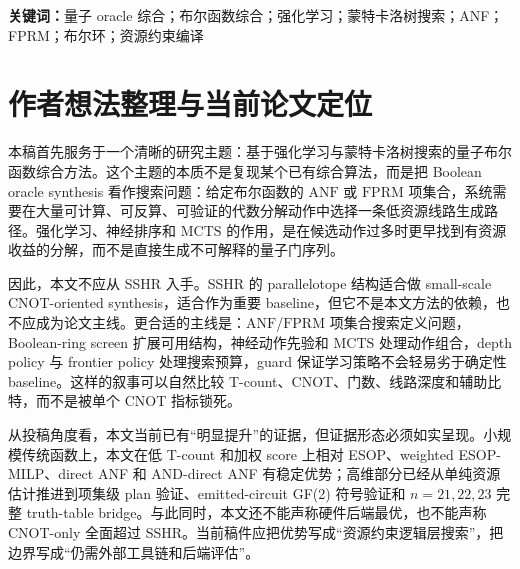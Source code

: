 \documentclass[UTF8,fontset=macnew,11pt]{ctexart}
\newcommand{\method}{Resource-NMCTS}
\newcommand{\anf}{\ensuremath{\mathrm{ANF}}}
\newcommand{\fprm}{\ensuremath{\mathrm{FPRM}}}
\newcommand{\mcts}{\ensuremath{\mathrm{MCTS}}}
\newcommand{\ttable}{truth-table}
\newcommand{\mct}{\ensuremath{\mathrm{MCT}}}
\begin{document}
\begin{abstract}
所有 6600 个项集级方法行均通过 factor-plan \anf{} 展开验证和 emitted X/CNOT/\mct{} circuit 的 GF(2) 多项式符号模拟验证；进一步的 $n=21,22,23$ bridge、large-policy $n=23$ rerun 和 cost-aware $n=23$ rerun 中，300/300 个方法行同时通过完整 \ttable{} oracle 验证、plan 验证和 emitted-circuit 符号验证。新增 emitted-circuit schedule proxy 显示，large frontier policy 在 $n=23$ 完整 bridge 上相对旧 policy 为 1/0/5，平均 score 再降 0.48\%，T-depth proxy 再降 0.45\%；cost-aware policy 则相对 large policy 以 +0.92\% score 代价换取 56.29\% plan time 下降和 12.62\% lifetime area 下降。本文的阶段性结论是：\method{} 已形成一条独立于 SSHR、以低 T-count 和低加权逻辑资源为目标的 Boolean oracle synthesis 主线；当前最需要补强的是官方 ROS/RevKit/mockturtle 复现，以及真正的后端映射评估。
\end{abstract}

\noindent\textbf{关键词：}量子 oracle 综合；布尔函数综合；强化学习；蒙特卡洛树搜索；ANF；FPRM；布尔环；资源约束编译

\section*{作者想法整理与当前论文定位}

本稿首先服务于一个清晰的研究主题：基于强化学习与蒙特卡洛树搜索的量子布尔函数综合方法。这个主题的本质不是复现某个已有综合算法，而是把 Boolean oracle synthesis 看作搜索问题：给定布尔函数的 \anf{} 或 \fprm{} 项集合，系统需要在大量可计算、可反算、可验证的代数分解动作中选择一条低资源线路生成路径。强化学习、神经排序和 \mcts{} 的作用，是在候选动作过多时更早找到有资源收益的分解，而不是直接生成不可解释的量子门序列。

因此，本文不应从 SSHR 入手。SSHR 的 parallelotope 结构适合做 small-scale CNOT-oriented synthesis，适合作为重要 baseline，但它不是本文方法的依赖，也不应成为论文主线。更合适的主线是：\anf{}/\fprm{} 项集合搜索定义问题，Boolean-ring screen 扩展可用结构，神经动作先验和 \mcts{} 处理动作组合，depth policy 与 frontier policy 处理搜索预算，guard 保证学习策略不会轻易劣于确定性 baseline。这样的叙事可以自然比较 T-count、CNOT、门数、线路深度和辅助比特，而不是被单个 CNOT 指标锁死。

从投稿角度看，本文当前已有“明显提升”的证据，但证据形态必须如实呈现。小规模传统函数上，本文在低 T-count 和加权 score 上相对 ESOP、weighted ESOP-MILP、direct ANF 和 AND-direct ANF 有稳定优势；高维部分已经从单纯资源估计推进到项集级 plan 验证、emitted-circuit GF(2) 符号验证和 $n=21,22,23$ 完整 \ttable{} bridge。与此同时，本文还不能声称硬件后端最优，也不能声称 CNOT-only 全面超过 SSHR。当前稿件应把优势写成“资源约束逻辑层搜索”，把边界写成“仍需外部工具链和后端评估”。
\end{document}
